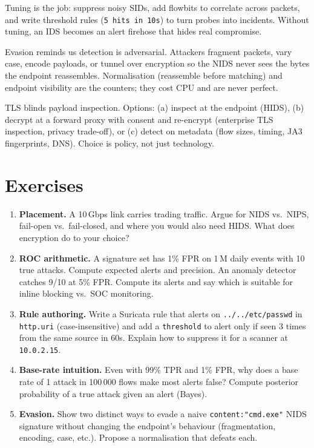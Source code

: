 Tuning is the job: suppress noisy SIDs, add flowbits to correlate across
packets, and write threshold rules (\texttt{5 hits in 10s}) to turn probes
into incidents. Without tuning, an IDS becomes an alert firehose that hides
real compromise.

Evasion reminds us detection is adversarial. Attackers fragment packets, vary
case, encode payloads, or tunnel over encryption so the NIDS never sees the
bytes the endpoint reassembles. Normalisation (reassemble before matching) and
endpoint visibility are the counters; they cost CPU and are never perfect.

\begin{remark}\label{rem:encrypt}
TLS blinds payload inspection. Options: (a) inspect at the endpoint (HIDS),
(b) decrypt at a forward proxy with consent and re-encrypt (enterprise
TLS inspection, privacy trade-off), or (c) detect on metadata (flow sizes,
timing, JA3 fingerprints, DNS). Choice is policy, not just technology.
\end{remark}

\section{Exercises}\label{sec:ch03-exercises}
\begin{enumerate}[label=E3.\arabic*, leftmargin=*, itemsep=0.6em]
    \item \textbf{Placement.} A 10\,Gbps link carries trading traffic.
    Argue for NIDS vs.\ NIPS, fail-open vs.\ fail-closed, and where you would
    also need HIDS. What does encryption do to your choice?
    \item \textbf{ROC arithmetic.} A signature set has 1\% FPR on 1\,M daily
    events with 10 true attacks. Compute expected alerts and precision. An
    anomaly detector catches 9/10 at 5\% FPR. Compute its alerts and say which
    is suitable for inline blocking vs.\ SOC monitoring.
    \item \textbf{Rule authoring.} Write a Suricata rule that alerts on
    \texttt{../../etc/passwd} in \texttt{http.uri} (case-insensitive) and add a
    \texttt{threshold} to alert only if seen 3 times from the same source in 60s.
    Explain how to suppress it for a scanner at \texttt{10.0.2.15}.
    \item \textbf{Base-rate intuition.} Even with 99\% TPR and 1\% FPR, why does a
    base rate of 1 attack in 100\,000 flows make most alerts false? Compute
    posterior probability of a true attack given an alert (Bayes).
    \item \textbf{Evasion.} Show two distinct ways to evade a naive
    \texttt{content:"cmd.exe"} NIDS signature without changing the endpoint's
    behaviour (fragmentation, encoding, case, etc.). Propose a normalisation
    that defeats each.
\end{enumerate}

